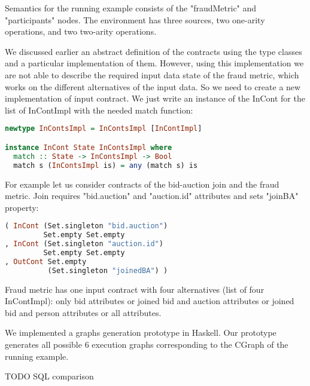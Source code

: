 Semantics for the running example consists of the "fraudMetric" and "participants" nodes.
The environment has three sources, two one-arity operations, and two two-arity operations.

We discussed earlier an abstract definition of the contracts using the type classes and a particular implementation of them. 
However, using this implementation we are not able to describe the required input data state of the fraud metric, which works on the different alternatives of the input data.
So we need to create a new implementation of input contract.
We just write an instance of the InCont for the list of InContImpl with the needed match function:

\begin{lstlisting}[language=Haskell]
newtype InContsImpl = InContsImpl [InContImpl]

instance InCont State InContsImpl where
  match :: State -> InContsImpl -> Bool
  match s (InContsImpl is) = any (match s) is
\end{lstlisting}

For example let us consider contracts of the bid-auction join and the fraud metric.
Join requires "bid.auction" and "auction.id" attributes and sets "joinBA" property:
\begin{lstlisting}[language=Haskell]
( InCont (Set.singleton "bid.auction")
         Set.empty Set.empty
, InCont (Set.singleton "auction.id")
         Set.empty Set.empty
, OutCont Set.empty
          (Set.singleton "joinedBA") )
\end{lstlisting}

Fraud metric has one input contract with four alternatives (list of four InContImpl):
only bid attributes
or joined bid and auction attributes
or joined bid and person attributes
or all attributes.

We implemented a graphs generation prototype in Haskell.
Our prototype generates all possible 6 execution graphs corresponding to the CGraph of the running example.

TODO SQL comparison
